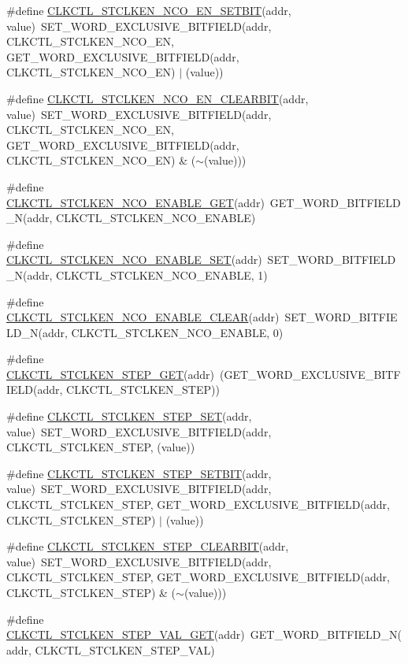 \begin{DoxyCompactItemize}
\item 
\#define \hyperlink{a00544_a00719b7d389198b3f44f7c69d5246cf1}{CLKCTL\_\-STCLKEN\_\-NCO\_\-EN\_\-SETBIT}(addr, value)~SET\_\-WORD\_\-EXCLUSIVE\_\-BITFIELD(addr, CLKCTL\_\-STCLKEN\_\-NCO\_\-EN, GET\_\-WORD\_\-EXCLUSIVE\_\-BITFIELD(addr, CLKCTL\_\-STCLKEN\_\-NCO\_\-EN) $|$ (value))
\item 
\#define \hyperlink{a00544_a9dc6cf0aab383d308b1069afbb701716}{CLKCTL\_\-STCLKEN\_\-NCO\_\-EN\_\-CLEARBIT}(addr, value)~SET\_\-WORD\_\-EXCLUSIVE\_\-BITFIELD(addr, CLKCTL\_\-STCLKEN\_\-NCO\_\-EN, GET\_\-WORD\_\-EXCLUSIVE\_\-BITFIELD(addr, CLKCTL\_\-STCLKEN\_\-NCO\_\-EN) \& ($\sim$(value)))
\item 
\#define \hyperlink{a00544_abf0893d29f75c1dbd65359afb8f83cf0}{CLKCTL\_\-STCLKEN\_\-NCO\_\-ENABLE\_\-GET}(addr)~GET\_\-WORD\_\-BITFIELD\_\-N(addr, CLKCTL\_\-STCLKEN\_\-NCO\_\-ENABLE)
\item 
\#define \hyperlink{a00544_a6e595856370f6f9f0c86e1ed104ea719}{CLKCTL\_\-STCLKEN\_\-NCO\_\-ENABLE\_\-SET}(addr)~SET\_\-WORD\_\-BITFIELD\_\-N(addr, CLKCTL\_\-STCLKEN\_\-NCO\_\-ENABLE, 1)
\item 
\#define \hyperlink{a00544_aa7deaf88c3451c991e25f415ec480572}{CLKCTL\_\-STCLKEN\_\-NCO\_\-ENABLE\_\-CLEAR}(addr)~SET\_\-WORD\_\-BITFIELD\_\-N(addr, CLKCTL\_\-STCLKEN\_\-NCO\_\-ENABLE, 0)
\item 
\#define \hyperlink{a00544_a39761bc021253a2f81ae228a31303ded}{CLKCTL\_\-STCLKEN\_\-STEP\_\-GET}(addr)~(GET\_\-WORD\_\-EXCLUSIVE\_\-BITFIELD(addr, CLKCTL\_\-STCLKEN\_\-STEP))
\item 
\#define \hyperlink{a00544_a1d7e15b07ca9911f8fe21c870ddf7ef8}{CLKCTL\_\-STCLKEN\_\-STEP\_\-SET}(addr, value)~SET\_\-WORD\_\-EXCLUSIVE\_\-BITFIELD(addr, CLKCTL\_\-STCLKEN\_\-STEP, (value))
\item 
\#define \hyperlink{a00544_a926a4bbc4fed2289679ceb0c5c2e8b00}{CLKCTL\_\-STCLKEN\_\-STEP\_\-SETBIT}(addr, value)~SET\_\-WORD\_\-EXCLUSIVE\_\-BITFIELD(addr, CLKCTL\_\-STCLKEN\_\-STEP, GET\_\-WORD\_\-EXCLUSIVE\_\-BITFIELD(addr, CLKCTL\_\-STCLKEN\_\-STEP) $|$ (value))
\item 
\#define \hyperlink{a00544_a415952142b7fe4cf27f3c5d4e193a9f2}{CLKCTL\_\-STCLKEN\_\-STEP\_\-CLEARBIT}(addr, value)~SET\_\-WORD\_\-EXCLUSIVE\_\-BITFIELD(addr, CLKCTL\_\-STCLKEN\_\-STEP, GET\_\-WORD\_\-EXCLUSIVE\_\-BITFIELD(addr, CLKCTL\_\-STCLKEN\_\-STEP) \& ($\sim$(value)))
\item 
\#define \hyperlink{a00544_a5b368bfc8f43acf89269602716028cd2}{CLKCTL\_\-STCLKEN\_\-STEP\_\-VAL\_\-GET}(addr)~GET\_\-WORD\_\-BITFIELD\_\-N(addr, CLKCTL\_\-STCLKEN\_\-STEP\_\-VAL)

\end{DoxyCompactItemize}
